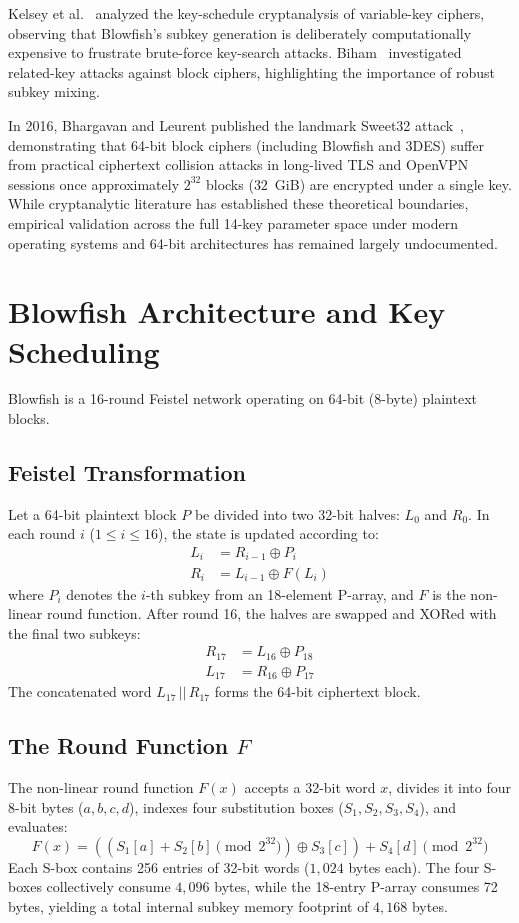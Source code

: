 \documentclass[conference]{IEEEtran}
\begin{document}
Kelsey et al.~\cite{kelsey1996keyschedule} analyzed the key-schedule cryptanalysis of variable-key ciphers, observing that Blowfish's subkey generation is deliberately computationally expensive to frustrate brute-force key-search attacks. Biham~\cite{biham1994relatedkey} investigated related-key attacks against block ciphers, highlighting the importance of robust subkey mixing. 

In 2016, Bhargavan and Leurent published the landmark Sweet32 attack~\cite{bhargavan2016sweet32}, demonstrating that 64-bit block ciphers (including Blowfish and 3DES) suffer from practical ciphertext collision attacks in long-lived TLS and OpenVPN sessions once approximately $2^{32}$ blocks ($32$~GiB) are encrypted under a single key. While cryptanalytic literature has established these theoretical boundaries, empirical validation across the full 14-key parameter space under modern operating systems and 64-bit architectures has remained largely undocumented.

\section{Blowfish Architecture and Key Scheduling}
Blowfish is a 16-round Feistel network operating on 64-bit (8-byte) plaintext blocks. 

\subsection{Feistel Transformation}
Let a 64-bit plaintext block $P$ be divided into two 32-bit halves: $L_0$ and $R_0$. In each round $i$ ($1 \le i \le 16$), the state is updated according to:
\begin{align}
L_i &= R_{i-1} \oplus P_i \\
R_i &= L_{i-1} \oplus F(L_i)
\end{align}
where $P_i$ denotes the $i$-th subkey from an 18-element P-array, and $F$ is the non-linear round function. After round 16, the halves are swapped and XORed with the final two subkeys:
\begin{align}
R_{17} &= L_{16} \oplus P_{18} \\
L_{17} &= R_{16} \oplus P_{17}
\end{align}
The concatenated word $L_{17} \,||\, R_{17}$ forms the 64-bit ciphertext block.

\subsection{The Round Function $F$}
The non-linear round function $F(x)$ accepts a 32-bit word $x$, divides it into four 8-bit bytes ($a, b, c, d$), indexes four substitution boxes ($S_1, S_2, S_3, S_4$), and evaluates:
\begin{equation}
F(x) = \left( \left( S_1[a] + S_2[b] \pmod{2^{32}} \right) \oplus S_3[c] \right) + S_4[d] \pmod{2^{32}}
\end{equation}
Each S-box contains 256 entries of 32-bit words ($1,024$ bytes each). The four S-boxes collectively consume $4,096$ bytes, while the 18-entry P-array consumes 72 bytes, yielding a total internal subkey memory footprint of $4,168$ bytes.
\end{document}

